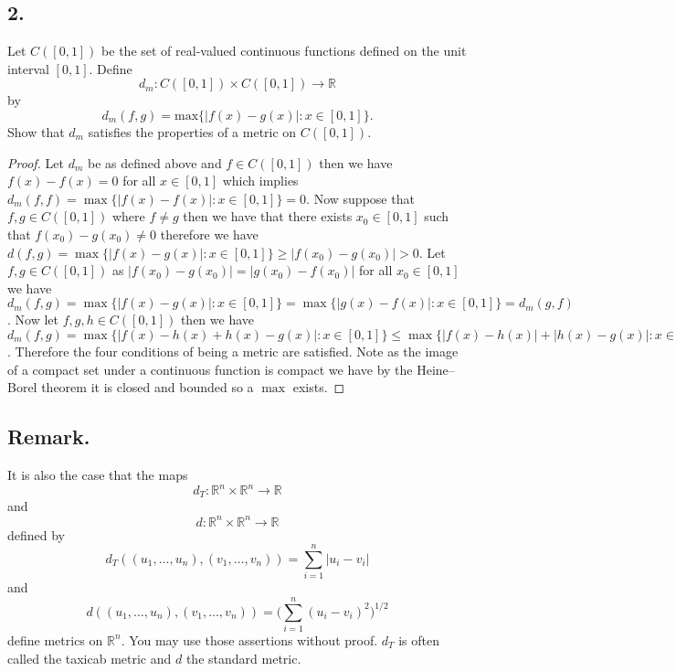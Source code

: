 \documentclass{amsart}
\theoremstyle{plain}
\theoremstyle{definition}
\theoremstyle{remark}
\begin{document}
\noindent
\subsection*{2.} Let $C([0,1])$ be the set of real-valued continuous functions defined on the unit interval $[0,1]$. Define
\[
    d_m : C([0,1]) \times C([0,1]) \rightarrow \mathbb R
\]
by
\[
    d_m (f,g) = \mbox{max}\{ |f(x)-g(x)| : x\in [0,1]\} .
\]
\noindent
Show that $d_m$ satisfies the properties of a metric on $C([0,1])$.

\vspace{.15in}

\begin{proof}
    Let $d_m$ be as defined above and $f\in C([0,1])$ then we have $f(x)-f(x)=0$ for all $x\in [0,1]$ which implies $d_m(f,f)=\max\{|f(x)-f(x)|:x\in [0,1]\}=0$. Now suppose that $f,g\in C([0,1])$ where $f\not = g$ then we have that there exists $x_0\in [0,1]$ such that $f(x_0)-g(x_0) \not = 0$ therefore we have $d(f,g)=\max\{|f(x)-g(x)|:x\in [0,1]\}\geq |f(x_0)-g(x_0)|>0$. Let $f,g\in C([0,1])$ as $|f(x_0)-g(x_0)|=|g(x_0)-f(x_0)|$ for all $x_0\in [0,1]$ we have $d_m(f,g)=\max\{|f(x)-g(x)|:x\in [0,1]\}=\max\{|g(x)-f(x)|:x\in [0,1]\}=d_m(g,f)$. Now let $f,g,h\in C([0,1])$ then we have $d_m(f,g)=\max\{|f(x)-h(x)+h(x)-g(x)|: x\in [0,1]\}\leq \max\{|f(x)-h(x)|+|h(x)-g(x)|:x\in [0,1]\}\leq \max\{|f(x)-h(x)|:x\in [0,1]\}+\max\{|h(x)-g(x)|:x\in [0,1]\}= d_m(f,h)+d_m(h,g)$. Therefore the four conditions of being a metric are satisfied. Note as the image of a compact set under a continuous function is compact we have by the Heine–Borel theorem it is closed and bounded so a $\max$ exists.
\end{proof}


\noindent
\subsection*{Remark.} It is also the case that the maps
\[
    d_T : \mathbb R ^n \times \mathbb R ^n \rightarrow \mathbb R
\]
and
\[
    d : \mathbb R ^n \times \mathbb R ^n \rightarrow \mathbb R
\]
defined by
\[
    d_T( (u_1, \ldots , u_n) , (v_1, \ldots , v_n )) = \sum _{i=1}^n |u_i - v_i|
\]
and
\[
    d( (u_1, \ldots , u_n) , (v_1, \ldots , v_n )) = \big( \sum  _{i=1}^n (u_i - v_i)^2 \big) ^{1/2}
\]
define metrics on $\mathbb R ^n$. You may use those assertions without proof. $d_T$ is often called the taxicab metric and $d$ the standard metric.

\vspace{.15in}
\end{document}
